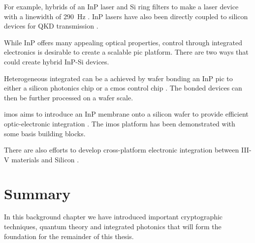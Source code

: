 For example, hybrids of an \ac{InP} laser and Si ring filters to make a laser device with a linewidth of \SI{290}{Hz} \cite{Fan2017}. \ac{InP} lasers have also been directly coupled to silicon devices for \ac{QKD} transmission \cite{Agnesi2019}.

While \ac{InP} offers many appealing optical properties, control through integrated electronics is desirable to create a scalable \ac{pic} platform. There are two ways that could create hybrid \ac{InP}-Si devices. 

Heterogeneous integrated can be a achieved by wafer bonding an \ac{InP} \ac{pic} to either a silicon photonics chip or a \ac{cmos} control chip \cite{jeppix}. The bonded devices can then be further processed on a wafer scale.

\Ac{imos} aims to introduce an \ac{InP} membrane onto a silicon wafer to provide efficient optic-electronic integration \cite{jeppix, IMOS}. The \ac{imos} platform has been demonstrated with some basis building blocks.

There are also efforts to develop cross-platform electronic integration between III-V materials and Silicon \cite{}. 

\section{Summary}

In this background chapter we have introduced important cryptographic techniques, quantum theory and integrated photonics that will form the foundation for the remainder of this thesis.

